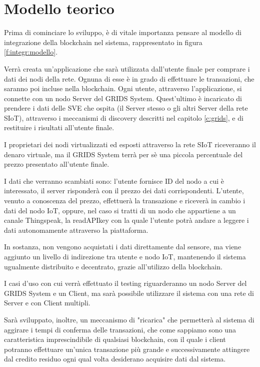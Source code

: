 \section{Modello teorico}
\label{c:integr:model}

Prima di cominciare lo sviluppo, è di vitale importanza pensare al modello di integrazione della blockchain nel sistema, rappresentato in figura \ref{f:integr:modello}. 


Verrà creata un'applicazione che sarà utilizzata dall'utente finale per comprare i dati dei nodi della rete. 
Ognuna di esse è in grado di effettuare le transazioni, che saranno poi incluse nella blockchain. Ogni utente, attraverso l'applicazione, si connette con un nodo Server del GRIDS System. Quest'ultimo è incaricato di prendere i dati delle SVE che ospita (il Server stesso o gli altri Server della rete SIoT), attraverso i meccanismi di discovery descritti nel capitolo \ref{c:grids}, e di restituire i risultati all'utente finale. 

I proprietari dei nodi virtualizzati ed esposti attraverso la rete SIoT riceveranno il denaro virtuale, ma il GRIDS System terrà per sè una piccola percentuale del prezzo presentato all'utente finale.

I dati che verranno scambiati sono: l'utente fornisce ID del nodo a cui è interessato, il server risponderà con il prezzo dei dati corrispondenti. L'utente, venuto a conoscenza del prezzo, effettuerà la transazione e riceverà in cambio i dati del nodo IoT, oppure, nel caso si tratti di un nodo che appartiene a un canale Thingspeak, la readAPIkey con la quale l'utente potrà andare a leggere i dati autonomamente attraverso la piattaforma.

In sostanza, non vengono acquistati i dati direttamente dal sensore, ma viene aggiunto un livello di indirezione tra utente e nodo IoT, mantenendo il sistema ugualmente distribuito e decentrato, grazie all'utilizzo della blockchain.

I casi d'uso con cui verrà effettuato il testing riguarderanno un nodo Server del GRIDS System e un Client, ma sarà possibile utilizzare il sistema con una rete di Server e con Client multipli.

Sarà sviluppato, inoltre, un meccanismo di "ricarica" che permetterà al sistema di aggirare i tempi di conferma delle transazioni, che come sappiamo sono una caratteristica imprescindibile di qualsiasi blockchain, con il quale i client potranno effettuare un'unica transazione più grande e successivamente attingere dal credito residuo ogni qual volta desiderano acquisire dati dal sistema.

